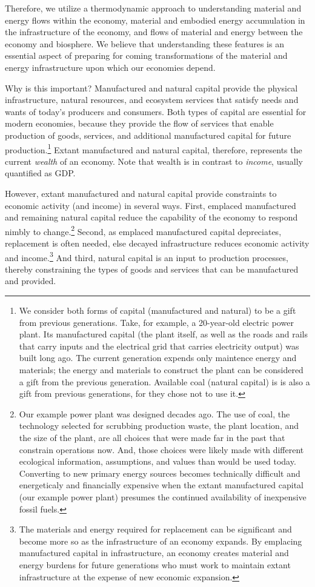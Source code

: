 Therefore, we utilize
a thermodynamic approach to understanding
material and energy flows within the economy,
material and embodied energy accumulation in the infrastructure of the economy, and
flows of material and energy between the economy and biosphere.
We believe that understanding these features
is an essential aspect of preparing for coming transformations 
of the material and energy infrastructure upon which our economies depend. 

Why is this important? 
Manufactured and natural capital provide
the physical infrastructure, natural resources, and
ecosystem services that satisfy needs and wants 
of today's producers and consumers.
Both types of capital are essential for modern economies, because
they provide the flow of services that enable production of 
goods, services, and additional manufactured capital 
for future production.\footnote{We 
	consider both forms of capital (manufactured and natural) 
	to be a gift from previous generations.
	Take, for example, a 20-year-old electric power plant.
	Its manufactured capital (the plant itself, 
	as well as the roads and rails that carry inputs 
	and the electrical grid that carries electricity output) 
	was built long ago. 
	The current generation
	expends only maintence energy and materials; 
	the energy and materials to construct the plant 
	can be considered a gift from the previous generation.
	Available coal (natural capital) is is also a gift from previous generations,
	for they chose not to use it.
	}
Extant manufactured and natural capital, therefore, represents 
the current \emph{wealth} of an economy. 
Note that wealth is in contrast to \emph{income}, 
usually quantified as GDP.

However, extant manufactured and natural capital
provide constraints to economic activity (and income) in several ways. 
First, emplaced manufactured and remaining natural capital 
reduce the capability of the economy to respond nimbly to change.\footnote{Our 
	example power plant was designed decades ago. 
	The use of coal, 
	the technology selected for scrubbing production waste, 
	the plant location, 
	and the size of the plant, are all choices that were made far in the past 
	that constrain operations now.
	And, those choices were likely made with different ecological information,
	assumptions, and values than would be used today.
	Converting to new primary energy sources
	becomes technically difficult and energeticaly and financially expensive 
	when the extant manufactured capital (our example power plant) 
	presumes the continued availability of inexpensive fossil fuels.
	}
Second, as emplaced manufactured capital depreciates, 
replacement is often needed,
else decayed infrastructure reduces economic activity and income.\footnote{The
	materials and energy required for replacement can be significant
	and become more so as the infrastructure of an economy expands.
	By emplacing manufactured capital in infrastructure, 
	an economy creates material and energy burdens for future generations 
	who must work to maintain extant infrastructure at the expense of 
	new economic expansion.
	}
And third, natural capital is an input to production processes, 
thereby constraining the types of goods and services 
that can be manufactured and provided. 

